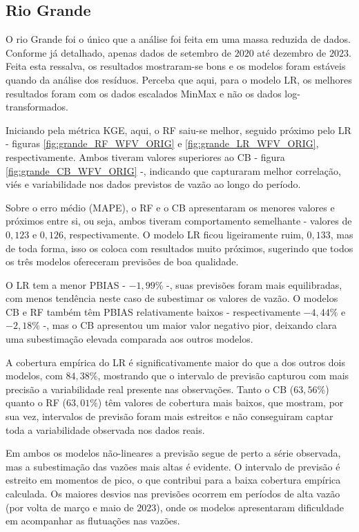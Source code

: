 \subsection{Rio Grande}

O rio Grande foi o único que a análise foi feita em uma massa reduzida de dados. Conforme já detalhado, apenas dados de setembro de $2020$ até dezembro de $2023$. Feita esta ressalva, os resultados mostraram-se bons e os modelos foram estáveis quando da análise dos resíduos. Perceba que aqui, para o modelo LR, os melhores resultados foram com os dados escalados MinMax e não os dados log-transformados.

Iniciando pela métrica KGE, aqui, o RF saiu-se melhor, seguido próximo pelo LR - figuras \ref{fig:grande_RF_WFV_ORIG} e \ref{fig:grande_LR_WFV_ORIG}, respectivamente. Ambos tiveram valores superiores ao CB - figura \ref{fig:grande_CB_WFV_ORIG} -, indicando que capturaram melhor correlação, viés e variabilidade nos dados previstos de vazão ao longo do período.

Sobre o erro médio (MAPE), o RF e o CB apresentaram os menores valores e próximos entre si, ou seja, ambos tiveram comportamento semelhante - valores de $0,123$ e $0,126$, respectivamente. O modelo LR ficou ligeiramente ruim, $0,133$, mas de toda forma, isso os coloca com resultados muito próximos, sugerindo que todos os três modelos ofereceram previsões de boa qualidade.

O LR tem a menor PBIAS - $-1,99\%$ -, suas previsões foram mais equilibradas, com menos tendência neste caso de subestimar os valores de vazão. O modelos CB e RF também têm PBIAS relativamente baixos - respectivamente $-4,44\%$ e $-2,18\%$ -, mas o CB apresentou um maior valor negativo pior, deixando clara uma subestimação elevada comparada aos outros modelos.

A cobertura empírica do LR é significativamente maior do que a dos outros dois modelos, com $84,38\%$, mostrando que o intervalo de previsão capturou com mais precisão a variabilidade real presente nas observações. Tanto o CB ($63,56\%$) quanto o RF ($63,01\%$) têm valores de cobertura mais baixos, que mostram, por sua vez, intervalos de previsão foram mais estreitos e não conseguiram captar toda a variabilidade observada nos dados reais.

Em ambos os modelos não-lineares a previsão segue de perto a série observada, mas a subestimação das vazões mais altas é evidente. O intervalo de previsão é estreito em momentos de pico, o que contribui para a baixa cobertura empírica calculada. Os maiores desvios nas previsões ocorrem em períodos de alta vazão (por volta de março e maio de $2023$), onde os modelos apresentaram dificuldade em acompanhar as flutuações nas vazões.

